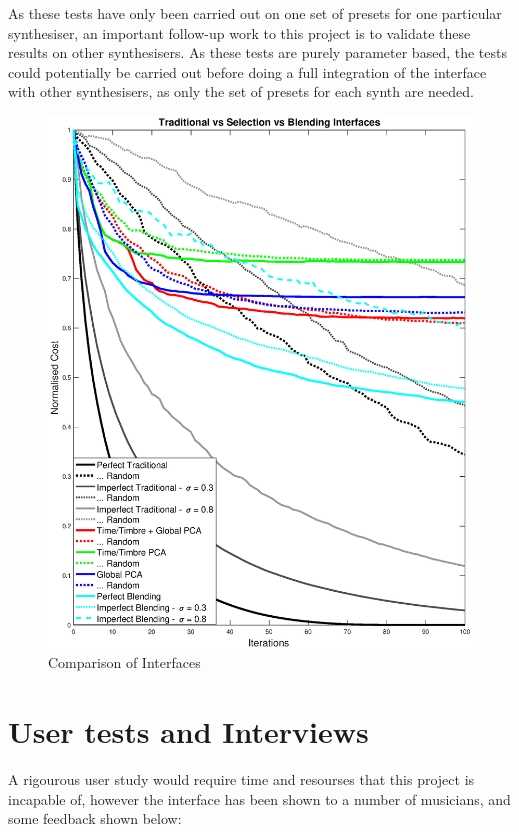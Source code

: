 \documentclass[11pt, oneside]{report}   	%
\begin{document}
As these tests have only been carried out on one set of presets for one particular synthesiser, an important follow-up work to this project is to validate these results on other synthesisers. As these tests are purely parameter based, the tests could potentially be carried out before doing a full integration of the interface with other synthesisers, as only the set of presets for each synth are needed.

\begin{figure}
	\hspace{-50pt}
	\includegraphics[width = 7.6in]{comparisonOfAllInterfaceGraph3.eps}
	\caption{Comparison of Interfaces}
	\label{fig:CombinedTest1}
\end{figure}

\chapter{User tests and Interviews}
A rigourous user study would require time and resourses that this project is incapable of, however the interface has been shown to a number of musicians, and some feedback shown below:
\end{document}
